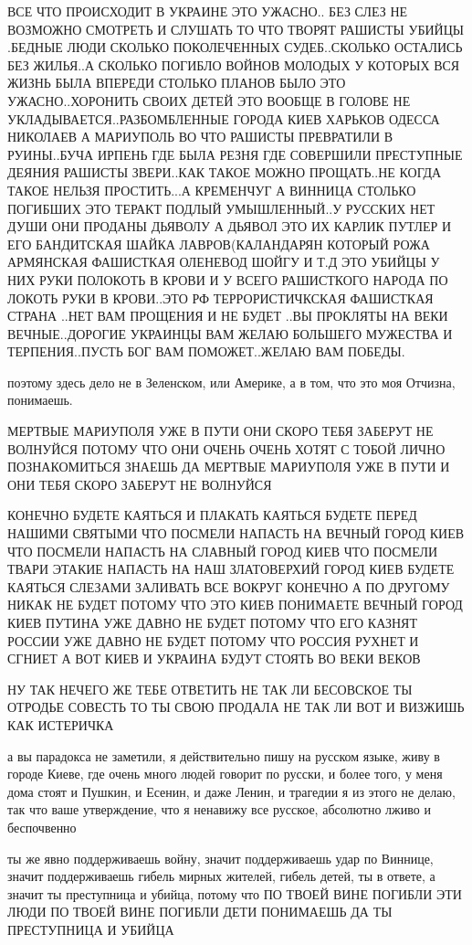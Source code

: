 ВСЕ ЧТО ПРОИСХОДИТ В УКРАИНЕ ЭТО УЖАСНО.. БЕЗ СЛЕЗ НЕ ВОЗМОЖНО СМОТРЕТЬ И
СЛУШАТЬ ТО ЧТО ТВОРЯТ РАШИСТЫ УБИЙЦЫ .БЕДНЫЕ ЛЮДИ СКОЛЬКО ПОКОЛЕЧЕННЫХ
СУДЕБ..СКОЛЬКО ОСТАЛИСЬ БЕЗ ЖИЛЬЯ..А СКОЛЬКО ПОГИБЛО ВОЙНОВ МОЛОДЫХ У КОТОРЫХ
ВСЯ ЖИЗНЬ БЫЛА ВПЕРЕДИ СТОЛЬКО ПЛАНОВ БЫЛО ЭТО УЖАСНО..ХОРОНИТЬ СВОИХ ДЕТЕЙ ЭТО
ВООБЩЕ В ГОЛОВЕ НЕ УКЛАДЫВАЕТСЯ..РАЗБОМБЛЕННЫЕ ГОРОДА КИЕВ ХАРЬКОВ ОДЕССА
НИКОЛАЕВ А МАРИУПОЛЬ ВО ЧТО РАШИСТЫ  ПРЕВРАТИЛИ В РУИНЫ..БУЧА ИРПЕНЬ ГДЕ БЫЛА
РЕЗНЯ ГДЕ СОВЕРШИЛИ ПРЕСТУПНЫЕ ДЕЯНИЯ РАШИСТЫ ЗВЕРИ..КАК ТАКОЕ МОЖНО
ПРОЩАТЬ..НЕ КОГДА ТАКОЕ НЕЛЬЗЯ ПРОСТИТЬ...А КРЕМЕНЧУГ А ВИННИЦА СТОЛЬКО
ПОГИБШИХ ЭТО ТЕРАКТ ПОДЛЫЙ УМЫШЛЕННЫЙ..У РУССКИХ НЕТ ДУШИ ОНИ ПРОДАНЫ ДЬЯВОЛУ А
ДЬЯВОЛ ЭТО ИХ КАРЛИК ПУТЛЕР И ЕГО БАНДИТСКАЯ ШАЙКА ЛАВРОВ(КАЛАНДАРЯН КОТОРЫЙ
РОЖА АРМЯНСКАЯ ФАШИСТКАЯ ОЛЕНЕВОД ШОЙГУ И Т.Д ЭТО УБИЙЦЫ У НИХ РУКИ ПОЛОКОТЬ В
КРОВИ И У ВСЕГО РАШИСТКОГО НАРОДА ПО ЛОКОТЬ РУКИ В КРОВИ..ЭТО РФ
ТЕРРОРИСТИЧКСКАЯ ФАШИСТКАЯ СТРАНА ..НЕТ ВАМ ПРОЩЕНИЯ И НЕ БУДЕТ ..ВЫ ПРОКЛЯТЫ
НА ВЕКИ ВЕЧНЫЕ..ДОРОГИЕ УКРАИНЦЫ ВАМ ЖЕЛАЮ БОЛЬШЕГО МУЖЕСТВА И ТЕРПЕНИЯ..ПУСТЬ
БОГ ВАМ ПОМОЖЕТ..ЖЕЛАЮ ВАМ ПОБЕДЫ.

поэтому здесь дело не в Зеленском, или Америке, а в том, что это моя Отчизна,
понимаешь.

МЕРТВЫЕ МАРИУПОЛЯ УЖЕ В ПУТИ ОНИ СКОРО ТЕБЯ ЗАБЕРУТ НЕ ВОЛНУЙСЯ ПОТОМУ ЧТО ОНИ
ОЧЕНЬ ОЧЕНЬ ХОТЯТ С ТОБОЙ ЛИЧНО ПОЗНАКОМИТЬСЯ ЗНАЕШЬ ДА МЕРТВЫЕ МАРИУПОЛЯ УЖЕ В
ПУТИ И ОНИ ТЕБЯ СКОРО ЗАБЕРУТ НЕ ВОЛНУЙСЯ

КОНЕЧНО БУДЕТЕ КАЯТЬСЯ И ПЛАКАТЬ КАЯТЬСЯ БУДЕТЕ ПЕРЕД НАШИМИ СВЯТЫМИ ЧТО
ПОСМЕЛИ НАПАСТЬ НА ВЕЧНЫЙ ГОРОД КИЕВ ЧТО ПОСМЕЛИ НАПАСТЬ НА СЛАВНЫЙ ГОРОД КИЕВ
ЧТО ПОСМЕЛИ ТВАРИ ЭТАКИЕ НАПАСТЬ НА НАШ ЗЛАТОВЕРХИЙ ГОРОД КИЕВ БУДЕТЕ КАЯТЬСЯ
СЛЕЗАМИ ЗАЛИВАТЬ ВСЕ ВОКРУГ КОНЕЧНО А ПО ДРУГОМУ НИКАК НЕ БУДЕТ ПОТОМУ ЧТО ЭТО
КИЕВ ПОНИМАЕТЕ ВЕЧНЫЙ ГОРОД КИЕВ ПУТИНА УЖЕ ДАВНО НЕ БУДЕТ ПОТОМУ ЧТО ЕГО
КАЗНЯТ РОССИИ УЖЕ ДАВНО НЕ БУДЕТ ПОТОМУ ЧТО РОССИЯ РУХНЕТ И СГНИЕТ А ВОТ КИЕВ И
УКРАИНА БУДУТ СТОЯТЬ ВО ВЕКИ ВЕКОВ

НУ ТАК НЕЧЕГО ЖЕ ТЕБЕ ОТВЕТИТЬ НЕ ТАК ЛИ БЕСОВСКОЕ ТЫ ОТРОДЬЕ СОВЕСТЬ ТО ТЫ
СВОЮ ПРОДАЛА НЕ ТАК ЛИ ВОТ И ВИЗЖИШЬ КАК ИСТЕРИЧКА


а вы парадокса не заметили, я действительно пишу на русском языке, живу в
городе Киеве, где очень много людей говорит по русски, и более того, у меня
дома стоят и Пушкин, и Есенин, и даже Ленин, и трагедии я из этого не делаю,
так что ваше утверждение, что я ненавижу все русское, абсолютно лживо и
беспочвенно

ты же явно поддерживаешь войну, значит поддерживаешь удар по Виннице, значит
поддерживаешь гибель мирных жителей, гибель детей, ты в ответе, а значит ты
преступница и убийца, потому что ПО ТВОЕЙ ВИНЕ ПОГИБЛИ ЭТИ ЛЮДИ ПО ТВОЕЙ ВИНЕ
ПОГИБЛИ ДЕТИ ПОНИМАЕШЬ ДА ТЫ ПРЕСТУПНИЦА И УБИЙЦА

